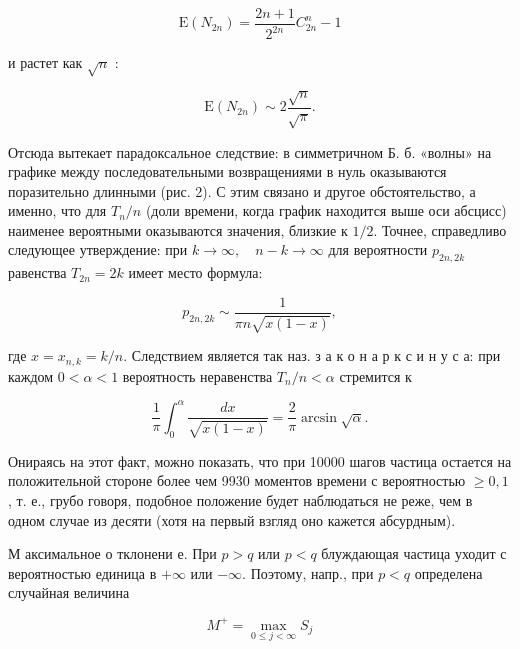 \documentclass[10pt]{article}
\begin{document}
\[

\mathrm{E}\left(N_{2 n}\right)=\frac{2 n+1}{2^{2 n}} C_{2 n}^{n}-1

\]



и растет как $\sqrt{n}$ :



\[

\mathrm{E}\left(N_{2 n}\right) \sim 2 \frac{\sqrt{n}}{\sqrt{\pi}} .

\]



Отсюда вытекает парадоксальное следствие: в симметричном Б. б. «волны» на графике между последовательными возвращениями в нуль оказываются поразительно длинными (рис. 2). С этим связано и другое обстоятельство, а именно, что для $T_{n} / n$ (доли времени, когда график находится выше оси абсцисс) наименее вероятными оказываются значения, близкие к $1 / 2$. Точнее, справедливо следующее утверждение: при $k \rightarrow \infty, \quad n-k \rightarrow \infty$ для вероятности $p_{2 n, 2 k}$ равенства $T_{2 n}=2 k$ имеет место формула:



\[

p_{2 n, 2 k} \sim \frac{1}{\pi n \sqrt{x(1-x)}},

\]



где $x=x_{n, k}=k / n$. Следствием является так наз. з а к о н а р к с и н у с а: при каждом $0<\alpha<1$ вероятность неравенства $T_{n} / n<\alpha$ стремится к



\[

\frac{1}{\pi} \int_{0}^{\alpha} \frac{d x}{\sqrt{x(1-x)}}=\frac{2}{\pi} \arcsin \sqrt{\alpha} .

\]



Онираясь на этот факт, можно показать, что при 10000 шагов частица остается на положительной стороне более чем 9930 моментов времени с вероятностью $\geqslant 0,1$, т. е., грубо говоря, подобное положение будет наблюдаться не реже, чем в одном случае из десяти (хотя на первый взгляд оно кажется абсурдным).



М аксимальное о тклонени е. При $p>q$ или $p<q$ блуждающая частица уходит с вероятностью единица в $+\infty$ или $-\infty$. Поэтому, напр., при $p<q$ определена случайная величина



\[

M^{+}=\max _{0 \leqslant j<\infty} S_{j}

\]
\end{document}
